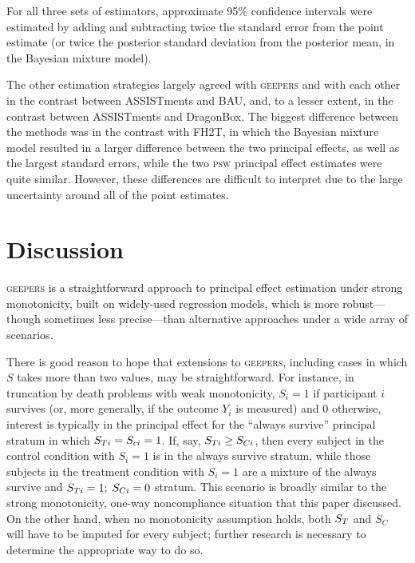 \documentclass[]{article}
\begin{document}
For all three sets of estimators, approximate 95\% confidence intervals were estimated by adding and subtracting twice the standard error from the point estimate (or twice the posterior standard deviation from the posterior mean, in the Bayesian mixture model).

The other estimation strategies largely agreed with \textsc{geepers} and with each other in the contrast between ASSISTments and BAU, and, to a lesser extent, in the contrast between ASSISTments and DragonBox. The biggest difference between the methods was in the contrast with FH2T, in which the Bayesian mixture model resulted in a larger difference between the two principal effects, as well as the largest standard errors, while the two \textsc{psw} principal effect estimates were quite similar.  However, these differences are difficult to interpret due to the large uncertainty around all of the point estimates.

\section{Discussion}\label{sec:discussion}
\textsc{geepers} is a straightforward approach to principal effect estimation under strong monotonicity, built on widely-used regression models, which is more robust---though sometimes less precise---than alternative approaches under a wide array of scenarios.

There is good reason to hope that extensions to \textsc{geepers}, including cases in which $S$ takes more than two values, may be straightforward.
For instance, in truncation by death problems \citep[e.g.][]{zhangRubin,ding2011} with weak monotonicity, $S_i=1$ if participant $i$ survives (or, more generally, if the outcome $Y_i$ is measured) and 0 otherwise, interest is typically in the principal effect for the ``always survive'' principal stratum in which $S_{Ti}=S_{ci}=1$.
If, say, $S_{Ti}\ge S_{Ci}$, then every subject in the control condition with $S_i=1$ is in the always survive stratum, while those subjects in the treatment condition with $S_i=1$ are a mixture of the always survive and $S_{Ti}=1;\;S_{Ci}=0$ stratum.
This scenario is broadly similar to the strong monotonicity, one-way noncompliance situation that this paper discussed.
On the other hand, when no monotonicity assumption holds, both $S_T$ and $S_C$ will have to be imputed for every subject; further research is necessary to determine the appropriate way to do so.
\end{document}

